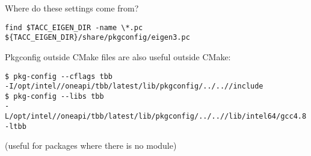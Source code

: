 \begin{numberedframe}{Where do these settings come from?}
\begin{lstlisting}
find $TACC_EIGEN_DIR -name \*.pc
${TACC_EIGEN_DIR}/share/pkgconfig/eigen3.pc    
\end{lstlisting}
\end{numberedframe}

\begin{numberedframe}{Pkgconfig outside CMake}
 files are also useful outside CMake:
\begin{lstlisting}
$ pkg-config --cflags tbb
-I/opt/intel//oneapi/tbb/latest/lib/pkgconfig/../..//include
$ pkg-config --libs tbb
-L/opt/intel//oneapi/tbb/latest/lib/pkgconfig/../..//lib/intel64/gcc4.8 -ltbb
\end{lstlisting}
(useful for packages where there is no module)
\end{numberedframe}

